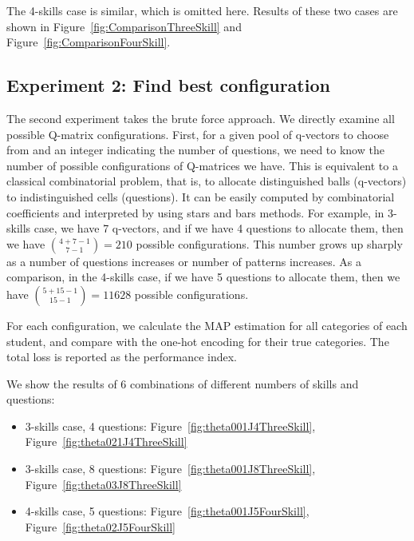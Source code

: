 \documentclass{edm_template}
\newcommand{\Michel}[1]{{\textcolor{purple}{[#1]}}}
\begin{document}
The 4-skills case is similar, which is omitted here. Results of these two cases are shown in Figure~\ref{fig:ComparisonThreeSkill} and Figure~\ref{fig:ComparisonFourSkill}.

\subsection{Experiment 2: Find best configuration}
The second experiment takes the brute force approach. We directly examine all possible Q-matrix configurations. First, for a given pool of q-vectors to choose from and an integer indicating the number of questions, we need to know the number of possible configurations of Q-matrices we have. This is equivalent to a classical combinatorial problem, that is, to allocate distinguished balls (q-vectors) to indistinguished cells (questions). It can be easily computed by combinatorial coefficients and interpreted by using stars and bars methods. For example, in 3-skills case, we have 7 q-vectors, and if we have 4 questions to allocate them, then we have ${{4+7-1}\choose {7-1}}=210$ possible configurations. This number grows up sharply as a number of questions increases or number of patterns increases. As a comparison, in the 4-skills case, if we have 5 questions to allocate them, then we have ${{5+15-1}\choose {15-1}}=11628$ possible configurations. 

For each configuration, we calculate the MAP estimation for all categories of each student, and compare with the one-hot encoding for their true categories. The total loss is reported as the performance index.

We show the results of 6 combinations of different numbers of skills and questions: 
\begin{itemize}
\item 3-skills case, 4 questions: Figure~\ref{fig:theta001J4ThreeSkill}, Figure~\ref{fig:theta021J4ThreeSkill}
\item 3-skills case, 8 questions: Figure~\ref{fig:theta001J8ThreeSkill}, Figure~\ref{fig:theta03J8ThreeSkill}
\item 4-skills case, 5 questions: Figure~\ref{fig:theta001J5FourSkill}, Figure~\ref{fig:theta02J5FourSkill}
\end{itemize}

\end{document}
